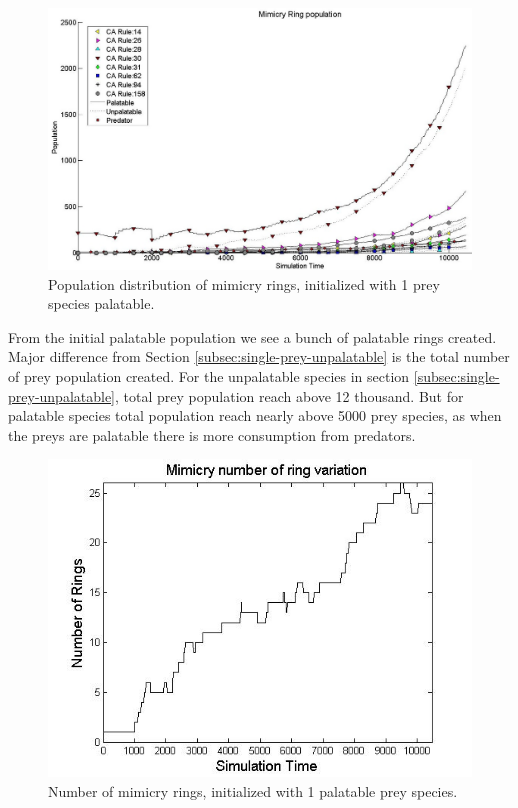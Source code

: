 \begin{figure}[H]
	\centering
	\includegraphics[scale=0.45]{images/simTime10k-1Prey-p}
	\caption[Population distribution of mimicry rings (1 prey species palatable)]{Population distribution of mimicry rings, initialized with 1 prey species palatable.}
	\label{fig:plot-1-prey-p}
\end{figure}

From the initial palatable population we see a bunch of palatable rings created. Major difference from Section \ref{subsec:single-prey-unpalatable} is the total number of prey population created. For the unpalatable species in section \ref{subsec:single-prey-unpalatable}, total prey population reach above 12 thousand. But for palatable species total population reach nearly above 5000 prey species, as when the preys are palatable there is more consumption from predators. 

\begin{figure}[H]
	\centering
	\includegraphics[scale=0.50]{images/ringSize10k-1Prey-p}
	\caption[Number of mimicry rings (1 palatable prey species)]{Number of mimicry rings, initialized with 1 palatable prey species.}
	\label{fig:ringSize8k-1-Prey-p}
\end{figure}

